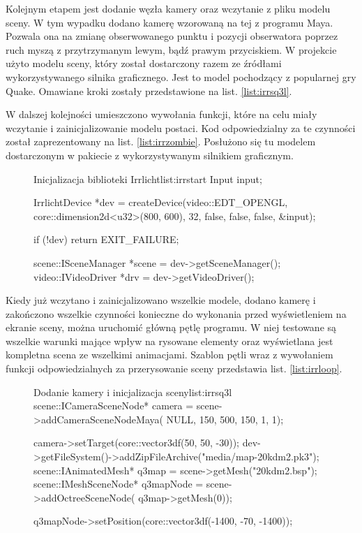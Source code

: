 \documentclass[11pt]{mwrep}
\begin{document}
Kolejnym etapem jest dodanie węzła kamery oraz wczytanie z pliku modelu sceny. W tym wypadku dodano kamerę wzorowaną na tej z programu Maya. Pozwala ona na zmianę obserwowanego punktu i pozycji obserwatora poprzez ruch myszą z przytrzymanym lewym, bądź prawym przyciskiem. W projekcie użyto modelu sceny, który został dostarczony razem ze źródłami wykorzystywanego silnika graficznego. Jest to model pochodzący z popularnej gry Quake. Omawiane kroki zostały przedstawione na list. \ref{list:irrsq3l}.

W dalszej kolejności umieszczono wywołania funkcji, które na celu miały wczytanie i zainicjalizowanie modelu postaci. Kod odpowiedzialny za te czynności został zaprezentowany na list. \ref{list:irrzombie}. Posłużono się tu modelem dostarczonym w pakiecie z wykorzystywanym silnikiem graficznym. 



\begin{figure}
\begin{listing}{Inicjalizacja biblioteki Irrlicht}{list:irrstart}
	Input input;
	
	IrrlichtDevice *dev = createDevice(video::EDT_OPENGL,
			core::dimension2d<u32>(800, 600),
			32, false, false, false, &input);

	if (!dev)
		return EXIT_FAILURE;

	scene::ISceneManager *scene = dev->getSceneManager();
	video::IVideoDriver *drv = dev->getVideoDriver();

\end{listing}
\end{figure}


Kiedy już wczytano i zainicjalizowano wszelkie modele, dodano kamerę i zakończono wszelkie czynności konieczne do wykonania przed wyświetleniem na ekranie sceny, można uruchomić główną pętlę programu. W niej testowane są wszelkie warunki mające wpływ na rysowane elementy oraz wyświetlana jest kompletna scena ze wszelkimi animacjami. Szablon pętli wraz z wywołaniem funkcji odpowiedzialnych za przerysowanie sceny przedstawia list. \ref{list:irrloop}.

\begin{figure}[p]
\begin{listing}{Dodanie kamery i inicjalizacja sceny}{list:irrsq3l}
	scene::ICameraSceneNode* camera = scene->addCameraSceneNodeMaya(
			NULL, 150, 500, 150, 1, 1);

	camera->setTarget(core::vector3df(50, 50, -30));
	dev->getFileSystem()->addZipFileArchive("media/map-20kdm2.pk3");
	scene::IAnimatedMesh* q3map = scene->getMesh("20kdm2.bsp");
	scene::IMeshSceneNode* q3mapNode = scene->addOctreeSceneNode(
			q3map->getMesh(0));

	q3mapNode->setPosition(core::vector3df(-1400, -70, -1400));
\end{listing}
\end{figure}
\end{document}
